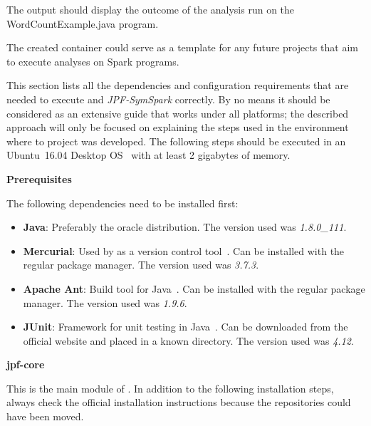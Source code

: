 The output should display the outcome of the analysis run on the WordCountExample.java program.

The created container could serve as a template for any future projects that aim to execute analyses on Spark programs.


This section lists all the dependencies and configuration requirements that are needed to execute \jpf{} and \textit{JPF-SymSpark} correctly. By no means it should be considered as an extensive guide that works under all platforms; the described approach will only be focused on explaining the steps used in the environment where to project was developed. The following steps should be executed in an Ubuntu~16.04 Desktop OS~\cite{WebUbuntu2017} with at least 2 gigabytes of memory.

\textbf{Prerequisites}

The following dependencies need to be installed first:

\begin{itemize}
	\item \textbf{Java}: Preferably the oracle distribution. The version used was \textit{1.8.0\_111}.
	\item \textbf{Mercurial}: Used by \jpf{} as a version control tool~\cite{WebMercurial2017}. Can be installed with the regular package manager. The version used was \textit{3.7.3}.
	\item \textbf{Apache Ant}: Build tool for Java~\cite{WebAnt2017}. Can be installed with the regular package manager. The version used was \textit{1.9.6}.
	\item \textbf{JUnit}: Framework for unit testing in Java~\cite{WebJUnit2017}. Can be downloaded from the official website and placed in a known directory. The version used was \textit{4.12}.
\end{itemize}

\textbf{jpf-core}

This is the main module of \jpf{}. In addition to the following installation steps, always check the official installation instructions because the repositories could have been moved.

